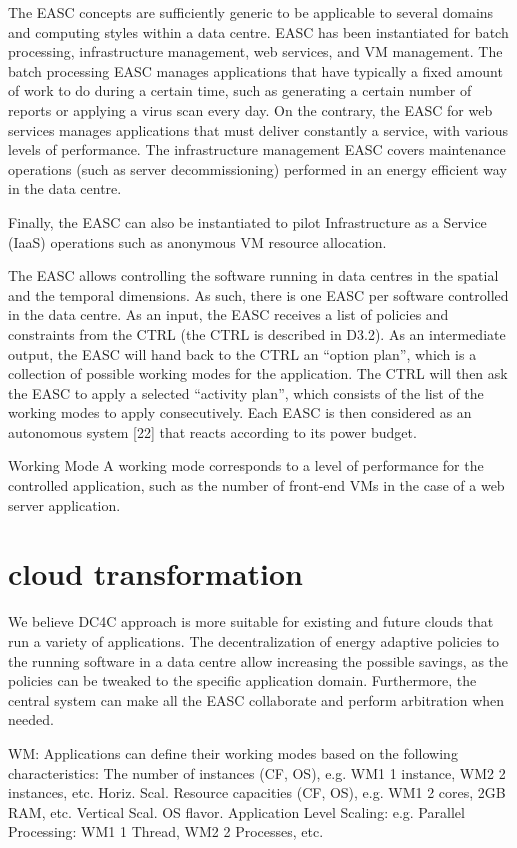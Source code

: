 The EASC concepts are sufficiently generic to be applicable to several domains and computing styles within a data centre. EASC has been instantiated for batch processing, infrastructure management, web services, and VM management. The batch processing EASC manages applications that have typically a fixed amount of work to do during a certain time, such as generating a certain number of reports or applying a virus scan every day. On the contrary, the EASC for web services manages applications that must deliver constantly a service, with various levels of performance. The infrastructure management EASC covers maintenance operations (such as server decommissioning) performed in an energy efficient way in the data centre.

Finally, the EASC can also be instantiated to pilot Infrastructure as a Service (IaaS) operations such as anonymous VM resource allocation.

The EASC allows controlling the software running in data centres in the spatial and the temporal dimensions. As such, there is one EASC per software controlled in the data centre. As an input, the EASC receives a list of policies and constraints from the CTRL (the CTRL is described in D3.2). As an intermediate output, the EASC will hand back to the CTRL an “option plan”, which is a collection of possible working modes for the application. The CTRL will then ask the EASC to apply a selected “activity plan”, which consists of the list of the working modes to apply consecutively. Each EASC is then considered as an autonomous system [22] that reacts according to its power budget.

Working Mode
A working mode corresponds to a level of performance for the controlled application, such as the number of front-end VMs in the case of a web server application.

\section{cloud transformation}
We believe DC4C approach is more suitable for existing and future clouds that run a variety of applications. The decentralization of energy adaptive policies to the running software in a data centre allow increasing the possible savings, as the policies can be tweaked to the specific application domain. Furthermore, the central system can make all the EASC collaborate and perform arbitration when needed.

WM:
Applications can define their working modes based on the following characteristics:
The number of instances (CF, OS), e.g. WM1 1 instance, WM2 2 instances, etc. Horiz. Scal.
Resource capacities (CF, OS), e.g. WM1 2 cores, 2GB RAM, etc. Vertical Scal. OS flavor.
Application Level Scaling: e.g. Parallel Processing: WM1 1 Thread, WM2 2 Processes, etc.

